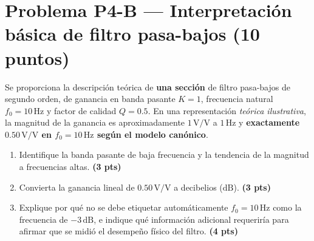 \documentclass[10pt, a4paper]{article}
\begin{document}
\section*{Problema P4-B --- Interpretación básica de filtro pasa-bajos (10 puntos)}

Se proporciona la descripción teórica de \textbf{una sección} de filtro pasa-bajos de segundo orden, de ganancia en banda pasante $K = 1$, frecuencia natural $f_0 = 10\,\mathrm{Hz}$ y factor de calidad $Q = 0.5$. En una representación \textit{teórica ilustrativa}, la magnitud de la ganancia es aproximadamente $1\,\mathrm{V/V}$ a $1\,\mathrm{Hz}$ y \textbf{exactamente $0.50\,\mathrm{V/V}$ en $f_0 = 10\,\mathrm{Hz}$ según el modelo canónico}.

\begin{center}
\end{center}

\begin{enumerate}
    \renewcommand{\labelenumi}{(\alph{enumi})}
    \setlength{\itemsep}{2pt}
    \item Identifique la banda pasante de baja frecuencia y la tendencia de la magnitud a frecuencias altas. \hfill \textbf{(3 pts)}
    \item Convierta la ganancia lineal de $0.50\,\mathrm{V/V}$ a decibelios ($\mathrm{dB}$). \hfill \textbf{(3 pts)}
    \item Explique por qué no se debe etiquetar automáticamente $f_0 = 10\,\mathrm{Hz}$ como la frecuencia de $-3\,\mathrm{dB}$, e indique qué información adicional requeriría para afirmar que se midió el desempeño físico del filtro. \hfill \textbf{(4 pts)}
\end{enumerate}
\end{document}
